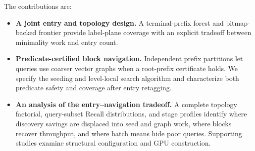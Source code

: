 The contributions are:
\begin{itemize}
\item \textbf{A joint entry and topology design.} A terminal-prefix forest
  and bitmap-backed frontier provide label-plane coverage with an explicit
  tradeoff between minimality work and entry count.
\item \textbf{Predicate-certified block navigation.} Independent prefix
  partitions let queries use coarser vector graphs when a root-prefix
  certificate holds. We specify the seeding and level-local search algorithm
  and characterize both predicate safety and coverage after entry retagging.
\item \textbf{An analysis of the entry--navigation tradeoff.} A complete
  topology factorial, query-subset Recall distributions, and stage profiles
  identify where discovery savings are displaced into seed and graph work,
  where blocks recover throughput, and where batch means hide poor queries.
  Supporting studies examine structural configuration and GPU construction.
\end{itemize}
